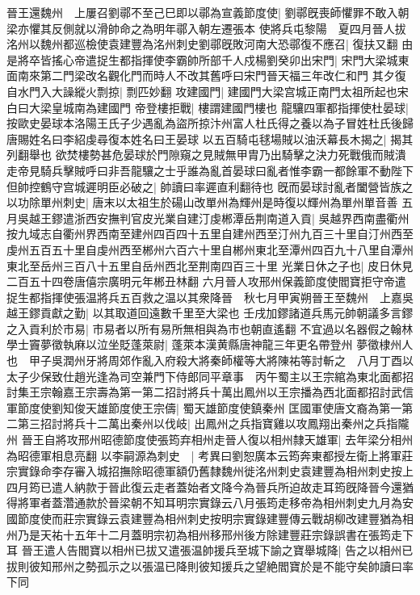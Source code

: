 晉王還魏州　上屢召劉鄩不至己巳即以鄩為宣義節度使|{
	劉鄩旣喪師懼罪不敢入朝梁亦懼其反側就以滑帥命之為明年鄩入朝左遷張本}
使將兵屯黎陽　夏四月晉人拔洺州以魏州都巡檢使袁建豐為洺州刺史劉鄩旣敗河南大恐鄩復不應召|{
	復扶又翻}
由是將卒皆搖心帝遣捉生都指揮使李霸帥所部千人戍楊劉癸卯出宋門|{
	宋門大梁城東面南來第二門梁改名觀化門而時人不改其舊呼曰宋門晉天福三年改仁和門}
其夕復自水門入大譟縱火剽掠|{
	剽匹妙翻}
攻建國門|{
	建國門大梁宫城正南門太祖所起也宋白曰大梁皇城南為建國門}
帝登樓拒戰|{
	樓謂建國門樓也}
龍驤四軍都指揮使杜晏球|{
	按歐史晏球本洛陽王氏子少遇亂為盜所掠汴州富人杜氏得之養以為子冒姓杜氏後歸唐賜姓名曰李紹虔尋復本姓名曰王晏球}
以五百騎屯毬場賊以油沃幕長木揭之|{
	揭其列翻舉也}
欲焚樓勢甚危晏球於門隙窺之見賊無甲胄乃出騎擊之決力死戰俄而賊潰走帝見騎兵擊賊呼曰非吾龍驤之士乎誰為亂首晏球曰亂者惟李霸一都餘軍不動陛下但帥控鶴守宫城遲明臣必破之|{
	帥讀曰率遲直利翻待也}
旣而晏球討亂者闔營皆族之以功除單州刺史|{
	唐末以太祖生於碭山改單州為輝州是時復以輝州為單州單音善}
五月吳越王鏐遣浙西安撫判官皮光業自建汀虔郴潭岳荆南道入貢|{
	吳越界西南盡衢州按九域志自衢州界西南至建州四百四十五里自建州西至汀州九百三十里自汀州西至虔州五百五十里自虔州西至郴州六百六十里自郴州東北至潭州四百九十八里自潭州東北至岳州三百八十五里自岳州西北至荆南四百三十里}
光業日休之子也|{
	皮日休見二百五十四卷唐僖宗廣明元年郴丑林翻}
六月晉人攻邢州保義節度使閻寶拒守帝遣捉生都指揮使張温將兵五百救之温以其衆降晉　秋七月甲寅朔晉王至魏州　上嘉吳越王鏐貢獻之勤|{
	以其取道回遠數千里至大梁也}
壬戌加鏐諸道兵馬元帥朝議多言鏐之入貢利於市易|{
	市易者以所有易所無相與為市也朝直遙翻}
不宜過以名器假之翰林學士竇夢徵執麻以泣坐貶蓬萊尉|{
	蓬萊本漢黄縣唐神龍三年更名帶登州}
夢徵棣州人也　甲子吳潤州牙將周郊作亂入府殺大將秦師權等大將陳祐等討斬之　八月丁酉以太子少保致仕趙光逢為司空兼門下侍郎同平章事　丙午蜀主以王宗綰為東北面都招討集王宗翰嘉王宗壽為第一第二招討將兵十萬出鳳州以王宗播為西北面都招討武信軍節度使劉知俊天雄節度使王宗儔|{
	蜀天雄節度使鎮秦州}
匡國軍使唐文裔為第一第二第三招討將兵十二萬出秦州以伐岐|{
	出鳳州之兵指寶雞以攻鳳翔出秦州之兵指隴州}
晉王自將攻邢州昭德節度使張筠弃相州走晉人復以相州隸天雄軍|{
	去年梁分相州為昭德軍相息亮翻}
以李嗣源為刺史　|{
	考異曰劉恕廣本云筠奔東都授左衛上將軍莊宗實錄命李存審入城招撫除昭德軍額仍舊隸魏州徙洺州刺史袁建豐為相州刺史按上四月筠已遣人納款于晉此復云走者蓋始者文降今為晉兵所迫故走耳筠旣降晉今還猶得將軍者蓋濳通款於晉梁朝不知耳明宗實錄云八月張筠走移帝為相州刺史九月為安國節度使而莊宗實錄云袁建豐為相州刺史按明宗實錄建豐傳云戰胡柳改建豐猶為相州乃是天祐十五年十二月蓋明宗初為相州移邢州後方除建豐莊宗錄誤書在張筠走下耳}
晉王遣人告閻寶以相州已拔又遣張温帥援兵至城下諭之寶舉城降|{
	告之以相州已拔則彼知邢州之勢孤示之以張温已降則彼知援兵之望絶閻寶於是不能守矣帥讀曰率下同}
